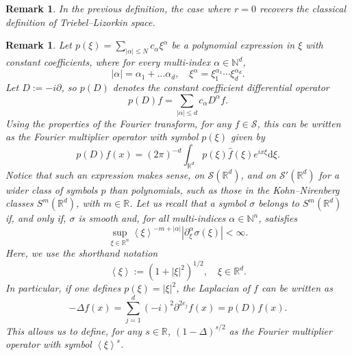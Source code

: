 \documentclass[a4paper, leqno, 10pt]{amsart}
\numberwithin{equation}{section}
\newtheorem{rmk}[thm]{Remark}
\newcommand{\dd}{\mathrm{d}}
\newcommand{\R}{\mathbb{R}}
\newcommand{\abs}[1]{\left|#1\right|}
\newcommand{\jap}[1]{\left<#1\right>}
\newcommand{\N}{\mathbb{N}}
\begin{document}
\begin{rmk}
In the previous definition, the case where $r=0$ recovers the classical definition of Triebel--Lizorkin space. 
\end{rmk}
\begin{rmk} Let $p(\xi)=\sum_{\abs{\alpha}\leq N} c_{\alpha} \xi^\alpha$ be a polynomial expression in $\xi$ with constant coefficients, where for every multi-index $\alpha\in \N^d$,  
\[
\abs{\alpha}=\alpha_1+\ldots\alpha_d, \quad \xi^\alpha=\xi_1^{\alpha_1}\cdots \xi_d^{\alpha_d}.
\]
Let $D:=-i\partial$, so $p(D)$ denotes the constant coefficient differential operator
\[
p(D)f=\sum_{\abs{\alpha}\leq d} c_\alpha D^\alpha f.
\]
Using the properties of the Fourier transform, for any $f\in \mathcal{S}$, this can be written as the Fourier multiplier operator with symbol $p(\xi)$ given by
\[
p(D)f(x)=(2\pi)^{-d}\int_{\R^d} p(\xi) \widehat{f}(\xi) e^{ix\xi} \dd \xi.
\]
Notice that such an expression makes sense, on $\mathcal{S}(\R^d)$, and on $\mathcal{S}'(\R^d)$ for a wider class of symbols $p$ than polynomials, such as those in the Kohn--Nirenberg classes $S^m(\R^d)$, with $m\in \R$. Let us recall that a symbol $\sigma$ belongs to $ S^m (\R^d)$ if, and only if, $\sigma$ is smooth and, for all multi-indices $\alpha\in\N^n$, satisfies 
\begin{equation}\label{S0}
\sup_{\xi\in\R^n} \jap{\xi}^{-m+\abs{\alpha}}\abs{\partial^\alpha_\xi\sigma(\xi)}<\infty.   
\end{equation}
Here, we use the shorthand notation \[\jap{\xi}:=(1+|\xi|^2)^{1/2}, \quad \xi \in \R^d.
\]
In particular, if one defines $p(\xi)=\abs{\xi}^2$, the Laplacian of $f$ can be written as 
\[
-\Delta f(x)=\sum_{j=1}^{d} (-i)^2\partial^{2e_j} f(x) =p(D) f(x).  
\]
This allows us to define, for any $s\in \R$, $(1-\Delta)^{s/2}$ as the Fourier multiplier operator with symbol $\jap{\xi}^{s}$.

\end{rmk}
\end{document}
